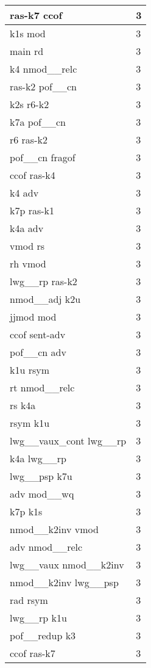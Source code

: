 \documentclass[a4 paper]{article}
\begin{document}
\begin{longtable}{p{}p{}}
ras-k7 ccof  & 3 \\ \midrule
k1s mod  & 3 \\ \midrule
main rd  & 3 \\ \midrule
k4 nmod\_\_relc  & 3 \\ \midrule
ras-k2 pof\_\_cn  & 3 \\ \midrule
k2s r6-k2  & 3 \\ \midrule
k7a pof\_\_cn  & 3 \\ \midrule
r6 ras-k2  & 3 \\ \midrule
pof\_\_cn fragof  & 3 \\ \midrule
ccof ras-k4  & 3 \\ \midrule
k4 adv  & 3 \\ \midrule
k7p ras-k1  & 3 \\ \midrule
k4a adv  & 3 \\ \midrule
vmod rs  & 3 \\ \midrule
rh vmod  & 3 \\ \midrule
lwg\_\_rp ras-k2  & 3 \\ \midrule
nmod\_\_adj k2u  & 3 \\ \midrule
jjmod mod  & 3 \\ \midrule
ccof sent-adv  & 3 \\ \midrule
pof\_\_cn adv  & 3 \\ \midrule
k1u rsym  & 3 \\ \midrule
rt nmod\_\_relc  & 3 \\ \midrule
rs k4a  & 3 \\ \midrule
rsym k1u  & 3 \\ \midrule
lwg\_\_vaux\_cont lwg\_\_rp  & 3 \\ \midrule
k4a lwg\_\_rp  & 3 \\ \midrule
lwg\_\_psp k7u  & 3 \\ \midrule
adv mod\_\_wq  & 3 \\ \midrule
k7p k1s  & 3 \\ \midrule
nmod\_\_k2inv vmod  & 3 \\ \midrule
adv nmod\_\_relc  & 3 \\ \midrule
lwg\_\_vaux nmod\_\_k2inv  & 3 \\ \midrule
nmod\_\_k2inv lwg\_\_psp  & 3 \\ \midrule
rad rsym  & 3 \\ \midrule
lwg\_\_rp k1u  & 3 \\ \midrule
pof\_\_redup k3  & 3 \\ \midrule
ccof ras-k7  & 3 \\ \midrule

\end{longtable}
\end{document}
